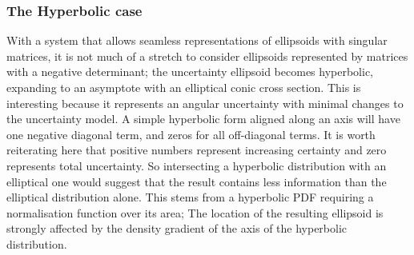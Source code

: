 \documentclass[a4paper, 11pt, titlepage]{article}
\begin{document}
    \subsubsection{The Hyperbolic case}
      \label{sec:hyperbolicCase}
      With a system that allows seamless representations of ellipsoids with singular matrices, it is not much of a stretch to consider ellipsoids represented by matrices with a negative determinant; the uncertainty ellipsoid becomes hyperbolic, expanding to an asymptote with an elliptical conic cross section.  This is interesting because it represents an angular uncertainty with minimal changes to the uncertainty model.
      A simple hyperbolic form aligned along an axis will have one negative diagonal term, and zeros for all off-diagonal terms.
      It is worth reiterating here that positive numbers represent increasing certainty and zero represents total uncertainty.  So intersecting a hyperbolic distribution with an elliptical one would suggest that the result contains less information than the elliptical distribution alone.
      This stems from a hyperbolic PDF requiring a normalisation function over its area;  The location of the resulting ellipsoid is strongly affected by the density gradient of the axis of the hyperbolic distribution.
\end{document}
